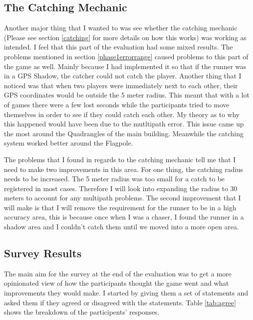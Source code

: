 \documentclass{l4proj}
\begin{document}
\subsection{The Catching Mechanic}
\label{phase1catching}
Another major thing that I wanted to was see whether the catching mechanic (Please see section \ref{catching} for more details on how this works)
was working as intended. I feel that this part of the evaluation had some mixed results. The problems mentioned in section
\ref{phase1errorrange} caused problems to this part of the game as well. Mainly because I had implemented it so that if the
runner was in a GPS Shadow, the catcher could not catch the player. Another thing that I noticed was that when two players
were immediately next to each other, their GPS coordinates would be outside the 5 meter radius. This meant that with a lot of
games there were a few lost seconds while the participants tried to move themselves in order to see if they could catch each other.
My theory as to why this happened would have been due to the mutltipath error. This issue came up the most around the Quadrangles
of the main building. Meanwhile the catching system worked better around the Flagpole.

The problems that I found in regards to the catching mechanic tell me that I need to make two improvements in this area. For one
thing, the catching radius needs to be increased. The 5 meter radius was too small for a catch to be registered in most cases. Therefore
I will look into expanding the radius to 30 meters to account for any multipath problems. The second improvement that I will
make is that I will remove the requirement for the runner to be in a high accuracy area, this is because once when I was a chaser,
I found the runner in a shadow area and I couldn't catch them until we moved into a more open area.




\subsection{Survey Results}
\label{phase1survey}
The main aim for the survey at the end of the evaluation was to get a more opinionated view of how the participants
thought the game went and what improvements they would make. I started by giving them a set of statements and asked
them if they agreed or disagreed with the statements. Table \ref{tab:agree} shows the breakdown of the participents'
responses.
\end{document}
